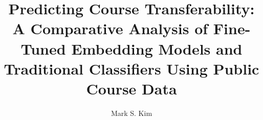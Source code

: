 \documentclass{sfsuthesis}
\begin{document}

\title{Predicting Course Transferability: A Comparative Analysis of Fine-Tuned Embedding Models and Traditional Classifiers Using Public Course Data}
\author{Mark S. Kim}





% 





%     



% 

\pagestyle{headings}




% 
% 
% 

\printbibheading
\sloppy
\printbibliography
\fussy

% 
\end{document}
